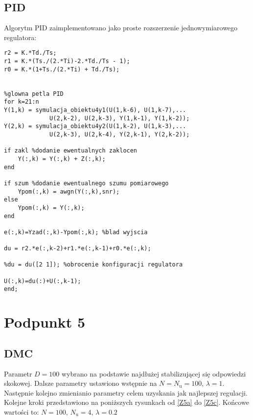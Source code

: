\section{PID}
Algorytm PID zaimplementowano jako proste rozszerzenie jednowymiarowego regulatora:

\begin{lstlisting}[style=Matlab-editor]
%parametry regulatora (wektory 2x1)
r2 = K.*Td./Ts; 
r1 = K.*(Ts./(2.*Ti)-2.*Td./Ts - 1); 
r0 = K.*(1+Ts./(2.*Ti) + Td./Ts);


%glowna petla PID
for k=21:n 
Y(1,k) = symulacja_obiektu4y1(U(1,k-6), U(1,k-7),...
			 U(2,k-2), U(2,k-3), Y(1,k-1), Y(1,k-2));
Y(2,k) = symulacja_obiektu4y2(U(1,k-2), U(1,k-3),...
			 U(2,k-3), U(2,k-4), Y(2,k-1), Y(2,k-2));

if zakl %dodanie ewentualnych zaklocen
	Y(:,k) = Y(:,k) + Z(:,k);
end

if szum %dodanie ewentualnego szumu pomiarowego
	Ypom(:,k) = awgn(Y(:,k),snr);
else
	Ypom(:,k) = Y(:,k);
end

e(:,k)=Yzad(:,k)-Ypom(:,k); %blad wyjscia

du = r2.*e(:,k-2)+r1.*e(:,k-1)+r0.*e(:,k);

%du = du([2 1]); %obrocenie konfiguracji regulatora

U(:,k)=du(:)+U(:,k-1); 
end; 
\end{lstlisting}
	


\chapter{Podpunkt 5}

\section{DMC}
Parametr $ D = \num{100} $ wybrano na podstawie najdłużej stabilizującej się odpowiedzi skokowej. Dalsze parametry ustawiono wstępnie na $ N = N_\mathrm{u} = \num{100} $, $ \lambda = \num{1} $. Następnie kolejno zmienianio parametry celem uzyskania jak najlepszej regulacji. Kolejne kroki przedstawiono na poniższych rysunkach od \ref{Z5a} do \ref{Z5c}. Końcowe wartości to: $ N = \num{100} $, $ N_\mathrm{u} = \num{4} $, $ \lambda = \num{0,2} $

